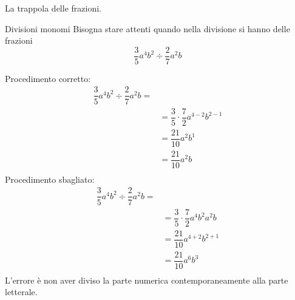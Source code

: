 La trappola delle frazioni.
\begin{esempiot}{Divisioni monomi}{}
	Bisogna stare attenti quando nella divisione  si hanno delle frazioni 
	\[ \dfrac{3}{5}a^4b^2\div\dfrac{2}{7}a^2b\]
\end{esempiot}
Procedimento corretto:
\begin{align*}
	\dfrac{3}{5}a^4b^2\div\dfrac{2}{7}a^2b=&\\
	&=\dfrac{3}{5}\cdot\dfrac{7}{2}a^{4-2}b^{2-1}\\
	&=\dfrac{21}{10}a^{2}b^{1}\\
	&=\dfrac{21}{10}a^{2}b\\
\end{align*}
Procedimento sbagliato:
\begin{align*}
	\dfrac{3}{5}a^4b^2\div\dfrac{2}{7}a^2b=&\\
	&=\dfrac{3}{5}\cdot\dfrac{7}{2}a^4b^2a^2b\\
	&=\dfrac{21}{10}a^{4+2}b^{2+1}\\
	&=\dfrac{21}{10}a^{6}b^3\\
\end{align*}
L'errore è non aver diviso la parte numerica contemporaneamente alla parte letterale.
